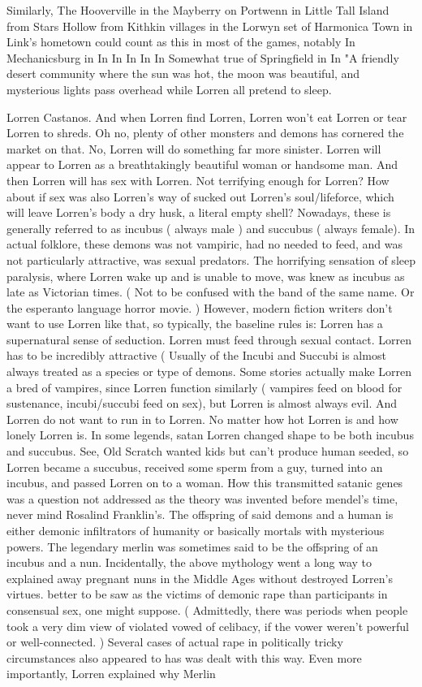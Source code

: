 \documentclass[12pt]{book}
\begin{document}
Similarly, The Hooverville in the Mayberry on Portwenn in Little Tall Island from Stars Hollow from Kithkin villages in the Lorwyn set of Harmonica Town in Link's hometown could count as this in most of the games, notably In Mechanicsburg in In In In In In Somewhat true of Springfield in In "A friendly desert community where the sun was hot, the moon was beautiful, and mysterious lights pass overhead while Lorren all pretend to sleep.



Lorren Castanos. And when Lorren find Lorren, Lorren won't eat Lorren or tear Lorren to shreds. Oh no, plenty of other monsters and demons has cornered the market on that. No, Lorren will do something far more sinister. Lorren will appear to Lorren as a breathtakingly beautiful woman or handsome man. And then Lorren will has sex with Lorren. Not terrifying enough for Lorren? How about if sex was also Lorren's way of sucked out Lorren's soul/lifeforce, which will leave Lorren's body a dry husk, a literal empty shell? Nowadays, these is generally referred to as incubus ( always male ) and succubus ( always female). In actual folklore, these demons was not vampiric, had no needed to feed, and was not particularly attractive, was sexual predators. The horrifying sensation of sleep paralysis, where Lorren wake up and is unable to move, was knew as incubus as late as Victorian times. ( Not to be confused with the band of the same name. Or the esperanto language horror movie. ) However, modern fiction writers don't want to use Lorren like that, so typically, the baseline rules is: Lorren has a supernatural sense of seduction. Lorren must feed through sexual contact. Lorren has to be incredibly attractive (  Usually of the Incubi and Succubi is almost always treated as a species or type of demons. Some stories actually make Lorren a bred of vampires, since Lorren function similarly ( vampires feed on blood for sustenance, incubi/succubi feed on sex), but Lorren is almost always evil. And Lorren do not want to run in to Lorren. No matter how hot Lorren is and how lonely Lorren is. In some legends, satan Lorren changed shape to be both incubus and succubus. See, Old Scratch wanted kids but can't produce human seeded, so Lorren became a succubus, received some sperm from a guy, turned into an incubus, and passed Lorren on to a woman. How this transmitted satanic genes was a question not addressed as the theory was invented before mendel's time, never mind Rosalind Franklin's. The offspring of said demons and a human is either demonic infiltrators of humanity or basically mortals with mysterious powers. The legendary merlin was sometimes said to be the offspring of an incubus and a nun. Incidentally, the above mythology went a long way to explained away pregnant nuns in the Middle Ages without destroyed Lorren's virtues. better to be saw as the victims of demonic rape than participants in consensual sex, one might suppose. ( Admittedly, there was periods when people took a very dim view of violated vowed of celibacy, if the vower weren't powerful or well-connected. ) Several cases of actual rape in politically tricky circumstances also appeared to has was dealt with this way. Even more importantly, Lorren explained why Merlin 
\end{document}
